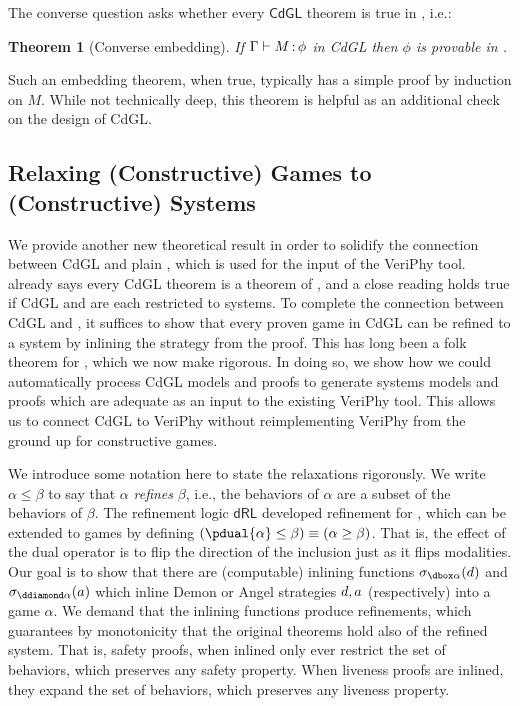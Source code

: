 \documentclass[12pt]{cmuthesis}
\newtheorem{theorem}{Theorem}
\theoremstyle{definition}
\theoremstyle{remark}
\newcommand{\rref}[2][]{\prettyref{#2}}
\newcommand{\dRL}{\ensuremath{\mathsf{dRL}}\xspace}
\newcommand{\CdGL}{\textsf{CdGL}\xspace}
\newcommand{\VeriPhy}{VeriPhy\xspace}
\begin{document}
The converse question asks whether every $\CdGL$ theorem is true in \dGL, i.e.:
\begin{theorem}[Converse embedding]
If $\Gamma\allowbreak\vdash M \allowbreak \mathop{:} \phi$ in \CdGL then $\phi$ is provable in \dGL.
\label{thm:conv-embed}
\end{theorem}
Such an embedding theorem, when true, typically has a simple proof by induction on $M$.
While not technically deep, this theorem is helpful as an additional check on the design of \CdGL.

\subsection{Relaxing (Constructive) Games to (Constructive) Systems}
We provide another new theoretical result in order to solidify the connection between \CdGL and plain \dL, which is used for the input of the \VeriPhy tool.
\rref{thm:conv-embed} already says every \CdGL theorem is a theorem of \dGL, and a close reading holds true if \CdGL and \dGL are each restricted to systems.
To complete the connection between \CdGL and \dL, it suffices to show that every proven game in \CdGL can be refined to a system by inlining the strategy from the proof.
This has long been a folk theorem for \dGL, which we now make rigorous.
In doing so, we show how we could automatically process \CdGL models and proofs to generate systems models and proofs which are adequate as an input to the existing \VeriPhy tool.
This allows us to connect \CdGL to \VeriPhy without reimplementing \VeriPhy from the ground up for constructive games.

We introduce some notation here to state the relaxations rigorously.
We write $\alpha \leq \beta$ to say that $\alpha$ \emph{refines} $\beta$, i.e., the behaviors of $\alpha$ are a subset of the behaviors of $\beta$.
The refinement logic \dRL developed refinement for \dL, which can be extended to games by defining $(\pdual{\alpha} \leq \beta) \equiv (\alpha \geq \beta)$.
That is, the effect of the dual operator is to flip the direction of the inclusion just as it flips modalities.
Our goal is to show that there are (computable) inlining functions $\dinline{\alpha}{\da}$ and $\ainline{\alpha}{\aa}$ which inline Demon or Angel strategies $d,a$ (respectively) into a game $\alpha$.
We demand that the inlining functions produce refinements, which guarantees by monotonicity that the original theorems hold also of the refined system.
That is, safety proofs, when inlined only ever restrict the set of behaviors, which preserves any safety property.
When liveness proofs are inlined, they expand the set of behaviors, which preserves any liveness property.
\end{document}

